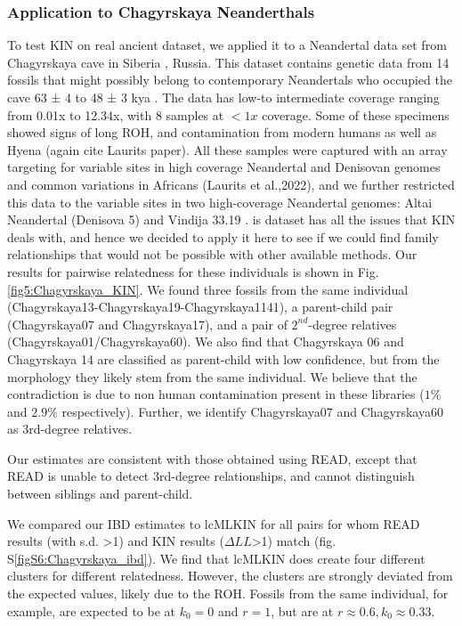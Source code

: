\documentclass[12pt, letterpaper]{article}
\begin{document}
\subsubsection{Application to Chagyrskaya Neanderthals}
To test KIN on real ancient dataset, we applied it to a Neandertal data set  from Chagyrskaya cave in Siberia \cite{kolobova_archaeological_2020-1}, Russia. This dataset contains genetic data from  14 fossils that might  possibly belong to contemporary Neandertals who occupied the cave 63 ± 4 to 48 ± 3 kya . The data has low-to intermediate coverage ranging from 0.01x to 12.34x, with 8 samples at  $<1x$ coverage. Some of these specimens showed signs of long ROH, and contamination from modern humans as well as Hyena (again cite Laurits paper). All these samples were captured with an array targeting for variable sites in high coverage Neandertal and Denisovan genomes and common variations in Africans (Laurits et al.,2022), and we further restricted  this data to the variable sites in two high-coverage Neandertal genomes: Altai Neandertal (Denisova 5) \cite{prufer_complete_2014} and Vindija 33.19 \cite{prufer_high-coverage_2017}. is dataset has all the issues that KIN deals with, and hence we decided to apply it here to see if we could find family relationships that would not be possible with other available methods. Our results for pairwise relatedness for these individuals is shown in Fig.\ref{fig5:Chagyrskaya_KIN}. We found three fossils from the same  individual (Chagyrskaya13-Chagyrskaya19-Chagyrskaya1141), a parent-child pair  (Chagyrskaya07 and Chagyrskaya17), and a pair of  $2^{nd}$-degree relatives (Chagyrskaya01/Chagyrskaya60). We also find that Chagyrskaya 06 and Chagyrskaya 14 are classified as parent-child with low confidence, but from the morphology they likely stem from the same individual. We believe that the contradiction is due to non human contamination present in these libraries ($1\%$ and $2.9\%$ respectively). Further, we identify   Chagyrskaya07 and Chagyrskaya60 as 3rd-degree relatives. 

Our estimates are consistent with those obtained using READ, except that READ is unable to detect 3rd-degree relationships, and cannot distinguish between siblings and parent-child.

We compared our IBD estimates to lcMLKIN for all pairs for whom READ results (with s.d. >1) and KIN results ($\Delta LL$>1) match (fig. S\ref{figS6:Chagyrskaya_ibd}).  We find that lcMLKIN does create four different clusters for different relatedness. However, the clusters are strongly deviated from the expected values, likely due to the ROH.  Fossils from the same individual, for example, are expected to be at $k_0 = 0$ and $r = 1$, but are at $r \approx 0.6, k_0 \approx 0.33$.
\end{document}
